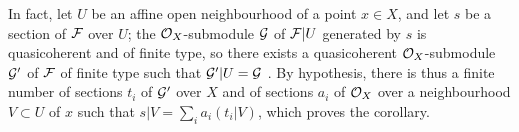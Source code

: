 \documentclass[../main.tex]{subfiles}
\begin{document}
In fact, let $U$ be an affine open neighbourhood of a point $x\in X$, and let
$s$ be a section of $\mathcal{F}$ over $U$; the $\mathcal{O}_X$-submodule $\mathcal{G}$ of
$\mathcal{F}|U$ generated by $s$ is quasicoherent and of finite type, so there
exists a quasicoherent $\mathcal{O}_X$-submodule $\mathcal{G}'$ of $\mathcal{F}$ of finite
type such that $\mathcal{G}'|U=\mathcal{G}$ . By hypothesis, there is thus a
finite number of sections $t_i$ of $\mathcal{G}'$ over $X$ and of sections $a_i$
of $\mathcal{O}_X$ over a neighbourhood $V\subset U$ of $x$ such that $s|V=\sum_i
a_i(t_i|V)$, which proves the corollary.
\end{document}
